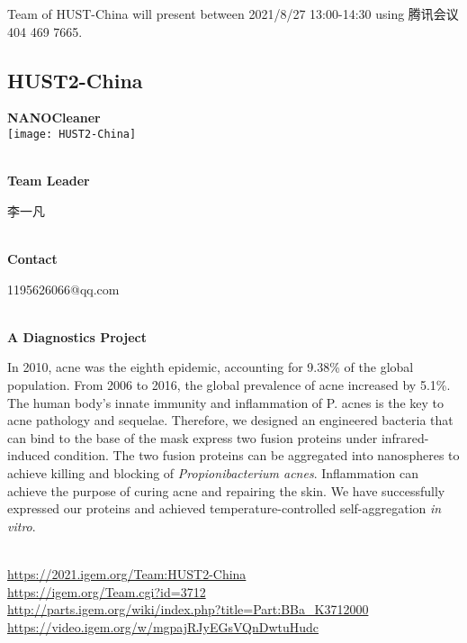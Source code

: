 Team of HUST-China will present between 2021/8/27 13:00-14:30        using 腾讯会议 404 469 7665.
\newpage


\subsection{\textcolor{Blu}{ HUST2-China } }
\vspace{5mm}
\begin{center}
\large{
  \textbf{ NANOCleaner }\\

  \texttt{[image: HUST2-China]}
}
\end{center}
\textbf{\\Team Leader}

  李一凡


\textbf{\\Contact}

  1195626066@qq.com


\textbf{\\A Diagnostics Project\\}\begin{spacing}{1.5}

In 2010, acne was the eighth epidemic, accounting for 9.38\% of the global population. From 2006 to 2016, the global prevalence of acne increased by 5.1\%. The human body's innate immunity and inflammation of P. acnes is the key to acne pathology and sequelae. Therefore, we designed an engineered bacteria that can bind to the base of the mask express two fusion proteins under infrared-induced condition. The two fusion proteins can be aggregated into nanospheres to achieve killing and blocking of \textit{Propionibacterium acnes}. Inflammation can achieve the purpose of curing acne and repairing the skin. We have successfully expressed our proteins and achieved temperature-controlled self-aggregation \textit{in vitro}.\end{spacing}
\\

\url{https://2021.igem.org/Team:HUST2-China }\\
\url{https://igem.org/Team.cgi?id=3712 }\\
\url{http://parts.igem.org/wiki/index.php?title=Part:BBa_K3712000 }\\
\url{https://video.igem.org/w/mgpajRJyEGsVQnDwtuHudc }\\

\vfill{}









